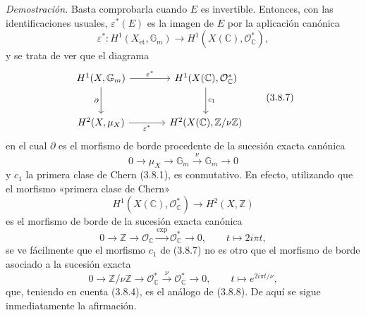 \emph{Demostración.} Basta comprobarla cuando $E$ es invertible. Entonces, con las identificaciones usuales, $\varepsilon^*(E)$ es la imagen de $E$ por la aplicación canónica
\[
\varepsilon^*:H^1(X_{\mathrm{\acute et}},\mathbb G_m)\to H^1(X(\mathbb C),\mathcal O_\mathbb C^*),
\tag{3.8.6}
\]
y se trata de ver que el diagrama
\[
\begin{tikzcd}[column sep=large,row sep=large]
H^1(X,\mathbb G_m) \arrow[r,"\varepsilon^*"] \arrow[d,"\partial"'] &
H^1(X(\mathbb C),\mathcal O_\mathbb C^*) \arrow[d,"c_1"]\\
H^2(X,\mu_X) \arrow[r,"\varepsilon^*"'] &
H^2(X(\mathbb C),\mathbb Z/\nu\mathbb Z)
\end{tikzcd}
\tag{3.8.7}
\]
en el cual $\partial$ es el morfismo de borde procedente de la sucesión exacta canónica
\[
0\to \mu_X\to\mathbb G_m\xrightarrow{\nu}\mathbb G_m\to0
\tag{3.8.8}
\]
y $c_1$ la primera clase de Chern (3.8.1), es conmutativo. En efecto, utilizando que el morfismo «primera clase de Chern»
\[
H^1(X(\mathbb C),\mathcal O_\mathbb C^*)\to H^2(X,\mathbb Z)
\]
es el morfismo de borde de la sucesión exacta canónica
\[
0\to\mathbb Z\to\mathcal O_\mathbb C\xrightarrow{\exp}\mathcal O_\mathbb C^*\to0,
\qquad
t\mapsto 2i\pi t,
\]
se ve fácilmente que el morfismo $c_1$ de (3.8.7) no es otro que el morfismo de borde asociado a la sucesión exacta
\[
0\to\mathbb Z/\nu\mathbb Z\to\mathcal O_\mathbb C^*\xrightarrow{\nu}\mathcal O_\mathbb C^*\to0,
\qquad
t\mapsto e^{2i\pi t/\nu},
\]
que, teniendo en cuenta (3.8.4), es el análogo de (3.8.8). De aquí se sigue inmediatamente la afirmación.
